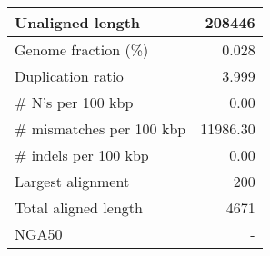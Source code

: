 \documentclass[12pt,a4paper]{article}
\begin{document}
\begin{table}[ht]
\begin{center}
\begin{tabular}{|l*{1}{|r}|}
Unaligned length & 208446 \\ \hline
Genome fraction (\%) & 0.028 \\ \hline
Duplication ratio & 3.999 \\ \hline
\# N's per 100 kbp & 0.00 \\ \hline
\# mismatches per 100 kbp & 11986.30 \\ \hline
\# indels per 100 kbp & 0.00 \\ \hline
Largest alignment & 200 \\ \hline
Total aligned length & 4671 \\ \hline
NGA50 & - \\ \hline
\end{tabular}
\end{center}
\end{table}
\end{document}
